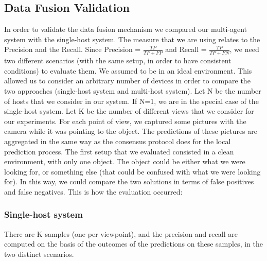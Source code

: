 \documentclass[10pt,conference,compsocconf]{IEEEtran}
\begin{document}
\subsection{Data Fusion Validation}
In order to validate the data fusion mechanism we compared our multi-agent system with the single-host system. The measure that we are using relates to the Precision and the Recall. Since Precision = $\frac{TP}{TP+FP}$ and Recall = $\frac{TP}{TP+FN}$, we need two different scenarios (with the same setup, in order to have consistent conditions) to evaluate them.
We assumed to be in an ideal environment. This allowed us to consider an arbitrary number of devices in order to compare the two approaches (single-host system and multi-host system). Let N be the number of hosts that we consider in our system. If N=1, we are in the special case of the single-host system. Let K be the number of different views that we consider for our experiments. For each point of view, we captured some pictures with the camera while it was pointing to the object. The predictions of these pictures are aggregated in the same way as the consensus protocol does for the local prediction process.
The first setup that we evaluated consisted in a clean environment, with only one object. The object could be either what we were looking for, or something else (that could be confused with what we were looking for). In this way, we could compare the two solutions in terms of false positives and false negatives.
This is how the evaluation occurred:
\subsubsection*{Single-host system}There are K samples (one per viewpoint), and the precision and recall are computed on the basis of the outcomes of the predictions on these samples, in the two distinct scenarios.
\end{document}
